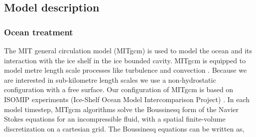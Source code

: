 \subsection{Model description}
\subsubsection{Ocean treatment} \label{sec:ocean_treatment}

The MIT general circulation model (MITgcm) \citep{marshall1997finite,marshall1997hydrostatic} is used to model the ocean and its interaction with the ice shelf in the ice bounded cavity. MITgcm is equipped to model metre length scale processes like turbulence and convection \citep[e.g.]{xu2012numerical}.
Because we are interested in sub-kilometre length scales we use a non-hydrostatic configuration with a free surface. Our configuration of MITgcm is based on ISOMIP experiments (Ice-Shelf Ocean Model Intercomparison Project) \citep{holland2003ice}.  In each model timestep, MITgcm algorithms solve the Boussinesq form of the Navier Stokes equations for an incompressible fluid, with a spatial finite-volume discretization on a cartesian grid.
The Boussinesq equations can be written as,


